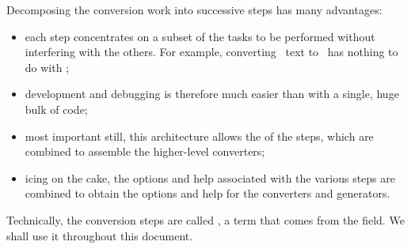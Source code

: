 Decomposing the conversion work into successive steps has many advantages:
\begin{itemize}
\item each step concentrates on a subset of the tasks to be performed without interfering with the others. For example, converting \mxml\ text to \msrRepr\ has nothing to do with \lily;

\item development and debugging is therefore much easier than with a single, huge bulk of code;

\item most important still, this architecture allows the  of the steps, which are combined to assemble the higher-level converters;

\item icing on the cake, the options and help associated with the various steps are combined to obtain the options and help for the converters and generators.
\end{itemize}

Technically, the conversion steps are called , a term that comes from the  field. We shall use it throughout this document.
